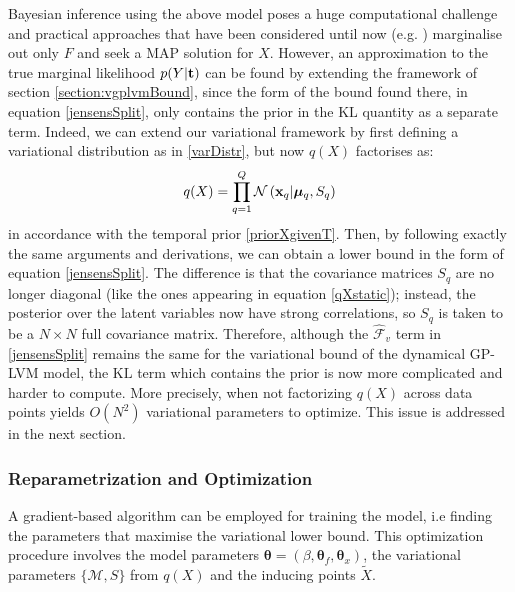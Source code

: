 \documentclass [10pt , a4paper]{article}
\begin{document}
\par Bayesian inference using the above model poses a huge computational
challenge and practical approaches that have been considered until now
(e.g. \cite{hgplvm, GPDM}) marginalise out only $F$ and seek a MAP
solution for $X$. However, an approximation to the true marginal likelihood $p(Y|\mathbf{t})$ can be found by extending the framework
of section \ref{section:vgplvmBound}, since the form of the bound found there, in equation \eqref{jensensSplit}, only contains the
prior in the $\text{KL}$ quantity as a separate term. Indeed, we can extend our variational framework by first defining a
variational distribution as in \eqref{varDistr}, but now $q(X)$ factorises as:
\begin{equation}
  q(X) = \prod_{q=1}^Q \mathcal{N} \left( \mathbf{x}_q | \boldsymbol \mu_q, S_q \right)
\end{equation}
%
\noindent in accordance with the temporal prior \eqref{priorXgivenT}. Then,
by following exactly the same arguments and derivations,
we can obtain a lower bound in the form of equation \eqref{jensensSplit}. The difference is that the covariance matrices 
$S_q$ are no longer diagonal (like the ones appearing in equation \eqref{qXstatic}); instead, the 
posterior over the latent variables now have strong correlations, so $S_q$ is taken to be a $N \times N$ full covariance
matrix. Therefore, although the $\hat{\mathcal{F}}_v$ term in \eqref{jensensSplit} remains the same for the variational bound of the dynamical GP-LVM model,
the $\text{KL}$ term which contains the prior is now more complicated and harder to compute. More precisely, when not
factorizing $q(X)$ across data points yields $O(N^2)$ variational parameters to optimize. This issue is addressed in the next section.





\subsubsection{Reparametrization and Optimization \label{optimisation}} 

A gradient-based algorithm can be employed for training the model, i.e finding the parameters
that maximise the variational lower bound.
This optimization procedure
involves the model parameters $\boldsymbol \theta =
(\beta, \boldsymbol \theta_f, \boldsymbol \theta_x)$, the variational
parameters $\{\mathcal{M}, S \}$ from $q(X)$ and the inducing
points $\tilde{X}$.
\end{document}
